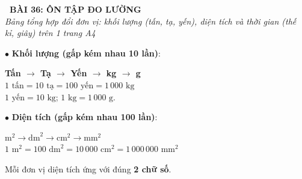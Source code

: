 \documentclass[14pt,a4paper,oneside]{extbook}
\begin{document}
\noindent
\begin{tcolorbox}[
  enhanced,
  colback=teal!8!white,
  colframe=teal!80!black,
  arc=3mm, boxrule=1pt,
  left=3mm, right=3mm, top=2mm, bottom=2mm,
  halign=center
]
  {\Large\bfseries\color{teal!90!black}\faBookmark\ BÀI 36: ÔN TẬP ĐO LƯỜNG}\\[1.5pt]
  {\footnotesize\itshape\color{black!75} Bảng tổng hợp đổi đơn vị: khối lượng (tấn, tạ, yến), diện tích và thời gian (thế kỉ, giây) trên 1 trang A4}
\end{tcolorbox}

\vspace{2mm}

\noindent
\begin{minipage}[t]{0.49\textwidth}
  \begin{tcolorbox}[
    enhanced,
    title={\footnotesize\bfseries\color{white}\faBalanceScale\ 1. Khối lượng \& Diện tích},
    colback=blue!2!white,
    colframe=blue!75!black,
    arc=2.5mm, boxrule=0.8pt, top=1.8mm, bottom=1.8mm, left=2mm, right=2mm
  ]
    \footnotesize
    $\bullet$ \textbf{Khối lượng (gấp kém nhau 10 lần)}:
    \begin{center}
      \textbf{Tấn $\rightarrow$ Tạ $\rightarrow$ Yến $\rightarrow$ kg $\rightarrow$ g}\\
      $1\text{ tấn} = 10\text{ tạ} = 100\text{ yến} = 1\,000\text{ kg}$\\
      $1\text{ yến} = 10\text{ kg}$; $1\text{ kg} = 1\,000\text{ g}$.
    \end{center}
    $\bullet$ \textbf{Diện tích (gấp kém nhau 100 lần)}:
    \begin{center}
      \textbf{$\text{m}^2 \rightarrow \text{dm}^2 \rightarrow \text{cm}^2 \rightarrow \text{mm}^2$}\\
      $1\text{ m}^2 = 100\text{ dm}^2 = 10\,000\text{ cm}^2 = 1\,000\,000\text{ mm}^2$
    \end{center}
    Mỗi đơn vị diện tích ứng với đúng \textbf{2 chữ số}.
  \end{tcolorbox}
\end{minipage}%
\hfill
\end{document}
